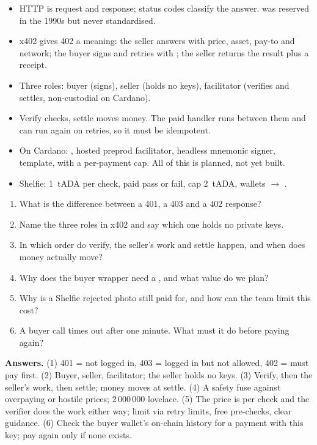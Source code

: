 \begin{keypoints}
\begin{itemize}
\item HTTP is request and response; status codes classify the answer.  was reserved in the 1990s but never standardised.
\item x402 gives 402 a meaning: the seller answers with price, asset, pay-to and network; the buyer signs and retries with ; the seller returns the result plus a receipt.
\item Three roles: buyer (signs), seller (holds no keys), facilitator (verifies and settles, non-custodial on Cardano).
\item Verify checks, settle moves money. The paid handler runs between them and can run again on retries, so it must be idempotent.
\item On Cardano: , hosted preprod facilitator, headless mnemonic signer,  template,  with a per-payment cap. All of this is planned, not yet built.
\item Shelfie: 1~tADA per check, paid pass or fail, cap 2~tADA, wallets  $\rightarrow$ .
\end{itemize}
\end{keypoints}

\begin{quizbox}
\begin{enumerate}
  \item What is the difference between a 401, a 403 and a 402 response?
  \item Name the three roles in x402 and say which one holds no private keys.
  \item In which order do verify, the seller's work and settle happen, and when does money actually move?
  \item Why does the buyer wrapper need a , and what value do we plan?
  \item Why is a Shelfie rejected photo still paid for, and how can the team limit this cost?
  \item A buyer call times out after one minute. What must it do before paying again?
\end{enumerate}
{\footnotesize\color{cGrey}\textbf{Answers.} (1) 401 = not logged in, 403 = logged in but not allowed, 402 = must pay first. (2) Buyer, seller, facilitator; the seller holds no keys. (3) Verify, then the seller's work, then settle; money moves at settle. (4) A safety fuse against overpaying or hostile prices; 2\,000\,000 lovelace. (5) The price is per check and the verifier does the work either way; limit via retry limits, free pre-checks, clear guidance. (6) Check the buyer wallet's on-chain history for a payment with this key; pay again only if none exists.\par}
\end{quizbox}
